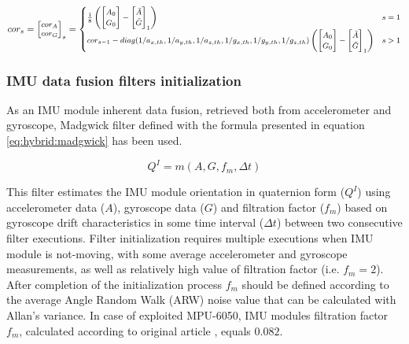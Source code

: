 \documentclass[sensors,article,submit,moreauthors,pdftex,10pt,a4paper]{mdpi}
\begin{document}
\begin{equation}
	\footnotesize
	cor_s = \begin{bmatrix}cor_A\\ cor_G\end{bmatrix}_s =
	\begin{cases}
		\frac{1}{8}\left(\begin{bmatrix}A_0                                                                          \\ G_0\end{bmatrix} - \begin{bmatrix}\bar{A}\\ \bar{G}\end{bmatrix}_1\right) & s = 1\\
		cor_{s-1} - diag(1/a_{x,th},1/a_{y,th},1/a_{z,th},1/g_{x,th},1/g_{y,th},1/g_{z,th}) \left(\begin{bmatrix}A_0 \\ G_0\end{bmatrix} - \begin{bmatrix}\bar{A}\\ \bar{G}\end{bmatrix}_1\right) & s > 1
	\end{cases}
	\label{eq:hybrid:IMUCalibration:2}
\end{equation}


\subsubsection{IMU data fusion filters initialization}
As an IMU module inherent data fusion, retrieved both from accelerometer and gyroscope, Madgwick filter \cite{Madgwick2011} defined with the formula presented in equation \ref{eq:hybrid:madgwick} has been used. 

\begin{equation}
Q^I=m(A,G,f_m,\Delta t)
\label{eq:hybrid:madgwick}
\end{equation}

This filter estimates the IMU module orientation in quaternion form ($Q^I$) using accelerometer data ($A$), gyroscope data ($G$) and filtration factor ($f_m$) based on gyroscope drift characteristics in some time interval ($\Delta t$) between two consecutive filter executions. Filter initialization requires multiple executions when IMU module is not-moving, with some average accelerometer and gyroscope measurements, as well as relatively high value of filtration factor (i.e. $f_m=2$). After completion of the initialization process $f_m$  should be defined according to the average Angle Random Walk (ARW) noise value that can be calculated with Allan’s variance. In case of exploited MPU-6050, IMU modules filtration factor $f_m$, calculated according to original article \cite{Madgwick2011}, equals $0.082$. 
\end{document}
